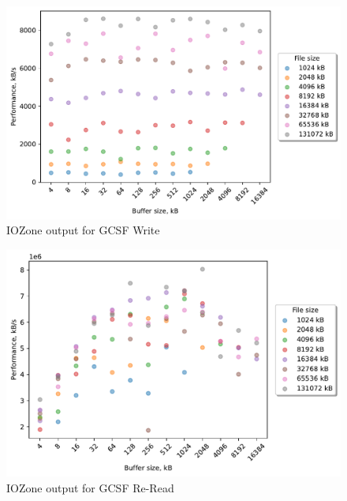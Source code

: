 \begin{figure}[!htb]
	\label{fig:bench_gcsf_write}
	\begin{center}
		\includegraphics[width=1.0\textwidth]{figures/benchmarking/gcsf/Write.pdf}
	\end{center}
	\caption{IOZone output for GCSF Write}
\end{figure}

\begin{figure}[!htb]
	\label{fig:bench_gcsf_re_read}
	\begin{center}
		\includegraphics[width=1.0\textwidth]{figures/benchmarking/gcsf/Re-Read.pdf}
	\end{center}
	\caption{IOZone output for GCSF \mbox{Re-Read}}
\end{figure}

